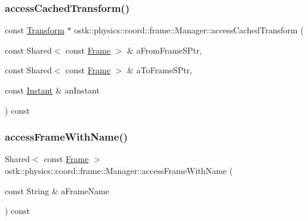 \subsubsection{\texorpdfstring{access\+Cached\+Transform()}{accessCachedTransform()}}
{\footnotesize\ttfamily const \hyperlink{classostk_1_1physics_1_1coord_1_1_transform}{Transform} $\ast$ ostk\+::physics\+::coord\+::frame\+::\+Manager\+::access\+Cached\+Transform (\begin{DoxyParamCaption}\item[{const Shared$<$ const \hyperlink{classostk_1_1physics_1_1coord_1_1_frame}{Frame} $>$ \&}]{a\+From\+Frame\+S\+Ptr,  }\item[{const Shared$<$ const \hyperlink{classostk_1_1physics_1_1coord_1_1_frame}{Frame} $>$ \&}]{a\+To\+Frame\+S\+Ptr,  }\item[{const \hyperlink{classostk_1_1physics_1_1time_1_1_instant}{Instant} \&}]{an\+Instant }\end{DoxyParamCaption}) const}

\mbox{\label{classostk_1_1physics_1_1coord_1_1frame_1_1_manager_abe8ac950d9f04b01a7c1165a6acb2a65}} 
\subsubsection{\texorpdfstring{access\+Frame\+With\+Name()}{accessFrameWithName()}}
{\footnotesize\ttfamily Shared$<$ const \hyperlink{classostk_1_1physics_1_1coord_1_1_frame}{Frame} $>$ ostk\+::physics\+::coord\+::frame\+::\+Manager\+::access\+Frame\+With\+Name (\begin{DoxyParamCaption}\item[{const String \&}]{a\+Frame\+Name }\end{DoxyParamCaption}) const}

\mbox{\label{classostk_1_1physics_1_1coord_1_1frame_1_1_manager_a0b6f34e9c38cc24982afc09b2b991c94}} 
